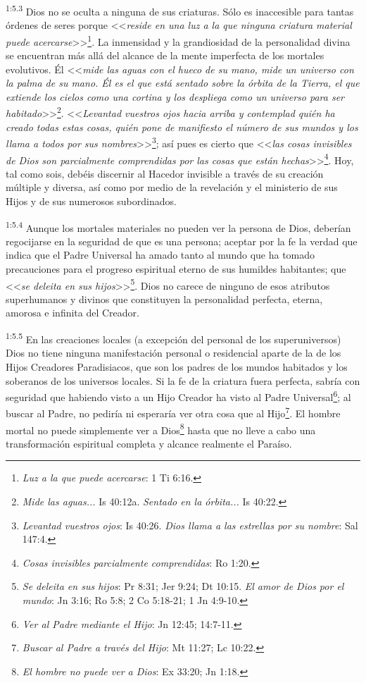 \par
\textsuperscript{1:5.3} Dios no se oculta a ninguna de sus criaturas. Sólo es inaccesible para tantas órdenes de seres porque <<\textit{reside en una luz a la que ninguna criatura material puede acercarse}>>\footnote{\textit{Luz a la que puede acercarse}: 1 Ti 6:16.}. La inmensidad y la grandiosidad de la personalidad divina se encuentran más allá del alcance de la mente imperfecta de los mortales evolutivos. Él <<\textit{mide las aguas con el hueco de su mano, mide un universo con la palma de su mano. Él es el que está sentado sobre la órbita de la Tierra, el que extiende los cielos como una cortina y los despliega como un universo para ser habitado}>>\footnote{\textit{Mide las aguas...} Is 40:12a. \textit{Sentado en la órbita...} Is 40:22.}. <<\textit{Levantad vuestros ojos hacia arriba y contemplad quién ha creado todas estas cosas, quién pone de manifiesto el número de sus mundos y los llama a todos por sus nombres}>>\footnote{\textit{Levantad vuestros ojos}: Is 40:26. \textit{Dios llama a las estrellas por su nombre}: Sal 147:4.}; así pues es cierto que <<\textit{las cosas invisibles de Dios son parcialmente comprendidas por las cosas que están hechas}>>\footnote{\textit{Cosas invisibles parcialmente comprendidas}: Ro 1:20.}. Hoy, tal como sois, debéis discernir al Hacedor invisible a través de su creación múltiple y diversa, así como por medio de la revelación y el ministerio de sus Hijos y de sus numerosos subordinados.

\par
\textsuperscript{1:5.4} Aunque los mortales materiales no pueden ver la persona de Dios, deberían regocijarse en la seguridad de que es una persona; aceptar por la fe la verdad que indica que el Padre Universal ha amado tanto al mundo que ha tomado precauciones para el progreso espiritual eterno de sus humildes habitantes; que <<\textit{se deleita en sus hijos}>>\footnote{\textit{Se deleita en sus hijos}: Pr 8:31; Jer 9:24; Dt 10:15. \textit{El amor de Dios por el mundo}: Jn 3:16; Ro 5:8; 2 Co 5:18-21; 1 Jn 4:9-10.}. Dios no carece de ninguno de esos atributos superhumanos y divinos que constituyen la personalidad perfecta, eterna, amorosa e infinita del Creador.

\par
\textsuperscript{1:5.5} En las creaciones locales (a excepción del personal de los superuniversos) Dios no tiene ninguna manifestación personal o residencial aparte de la de los Hijos Creadores Paradisiacos, que son los padres de los mundos habitados y los soberanos de los universos locales. Si la fe de la criatura fuera perfecta, sabría con seguridad que habiendo visto a un Hijo Creador ha visto al Padre Universal\footnote{\textit{Ver al Padre mediante el Hijo}: Jn 12:45; 14:7-11.}; al buscar al Padre, no pediría ni esperaría ver otra cosa que al Hijo\footnote{\textit{Buscar al Padre a través del Hijo}: Mt 11:27; Lc 10:22.}. El hombre mortal no puede simplemente ver a Dios\footnote{\textit{El hombre no puede ver a Dios}: Ex 33:20; Jn 1:18.} hasta que no lleve a cabo una transformación espiritual completa y alcance realmente el Paraíso.

